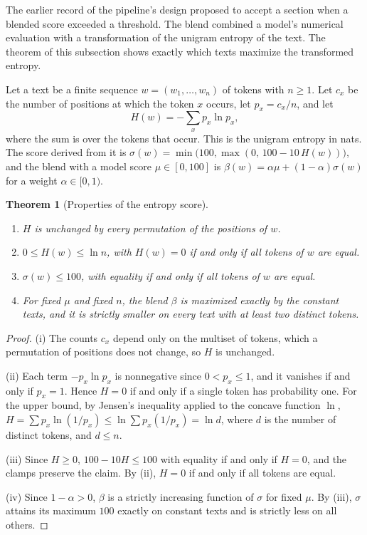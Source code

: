 \documentclass[11pt]{article}
\theoremstyle{plain}
\newtheorem{theorem}{Theorem}[section]
\theoremstyle{definition}
\theoremstyle{remark}
\begin{document}
The earlier record of the pipeline's design proposed to accept a section when a blended score exceeded a threshold. The blend combined a model's numerical evaluation with a transformation of the unigram entropy of the text. The theorem of this subsection shows exactly which texts maximize the transformed entropy.

Let a text be a finite sequence $w=(w_1,\ldots,w_n)$ of tokens with $n\ge1$. Let $c_x$ be the number of positions at which the token $x$ occurs, let $p_x=c_x/n$, and let
\[
H(w)=-\sum_{x}p_x\ln p_x,
\]
where the sum is over the tokens that occur. This is the unigram entropy in nats. The score derived from it is $\sigma(w)=\min\bigl(100,\max(0,\,100-10\,H(w))\bigr)$, and the blend with a model score $\mu\in[0,100]$ is $\beta(w)=\alpha\mu+(1-\alpha)\sigma(w)$ for a weight $\alpha\in[0,1)$.

\begin{theorem}[Properties of the entropy score]\label{thm:entropy}
\begin{enumerate}
\item[(i)] $H$ is unchanged by every permutation of the positions of $w$.
\item[(ii)] $0\le H(w)\le\ln n$, with $H(w)=0$ if and only if all tokens of $w$ are equal.
\item[(iii)] $\sigma(w)\le100$, with equality if and only if all tokens of $w$ are equal.
\item[(iv)] For fixed $\mu$ and fixed $n$, the blend $\beta$ is maximized exactly by the constant texts, and it is strictly smaller on every text with at least two distinct tokens.
\end{enumerate}
\end{theorem}

\begin{proof}
(i) The counts $c_x$ depend only on the multiset of tokens, which a permutation of positions does not change, so $H$ is unchanged.

(ii) Each term $-p_x\ln p_x$ is nonnegative since $0<p_x\le1$, and it vanishes if and only if $p_x=1$. Hence $H=0$ if and only if a single token has probability one. For the upper bound, by Jensen's inequality applied to the concave function $\ln$, $H=\sum p_x\ln(1/p_x)\le\ln\sum p_x(1/p_x)=\ln d$, where $d$ is the number of distinct tokens, and $d\le n$.

(iii) Since $H\ge0$, $100-10H\le100$ with equality if and only if $H=0$, and the clamps preserve the claim. By (ii), $H=0$ if and only if all tokens are equal.

(iv) Since $1-\alpha>0$, $\beta$ is a strictly increasing function of $\sigma$ for fixed $\mu$. By (iii), $\sigma$ attains its maximum $100$ exactly on constant texts and is strictly less on all others. \qedhere
\end{proof}
\end{document}
